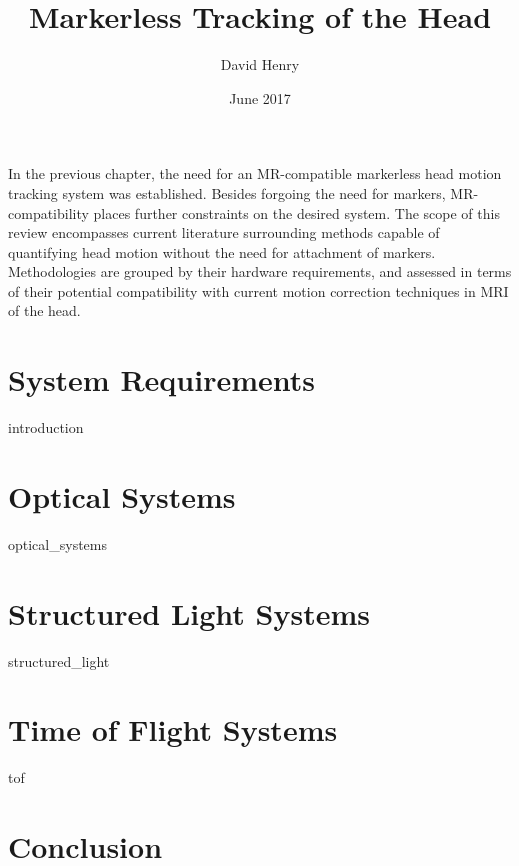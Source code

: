 \documentclass{article}
\title{Markerless Tracking of the Head}
\author{David Henry}
\date{June 2017}
\begin{document}
\maketitle
In the previous chapter, the need for an MR-compatible markerless head motion tracking system was established. Besides forgoing the need for markers, MR-compatibility places further constraints on the desired system. The scope of this review encompasses current literature surrounding methods capable of quantifying head motion without the need for attachment of markers. Methodologies are grouped by their hardware requirements, and assessed in terms of their potential compatibility with current motion correction techniques in MRI of the head.


\section{System Requirements} \label{Section1}
{introduction}

\section{Optical Systems} \label{Section2}
{optical_systems}

\section{Structured Light Systems} \label{Section3}
{structured_light}

\section{Time of Flight Systems} \label{Section4}
{tof}

\section{Conclusion} \label{Section5}

\printbibliography
\end{document}
